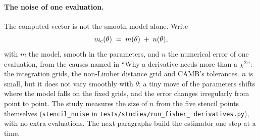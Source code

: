 \documentclass[11pt]{article}
\newcommand{\us}{\_\allowbreak}
\begin{document}
\paragraph{The noise of one evaluation.}
The computed vector is not the smooth model alone.  Write
\begin{equation}
  m_{\rm c}(\theta) \;=\; m(\theta) \;+\; n(\theta),
  \label{eq:noisedef}
\end{equation}
with $m$ the model, smooth in the parameters, and $n$ the numerical
error of one evaluation, from the causes named in ``Why a derivative
needs more than a $\chi^2$'': the integration grids, the non-Limber
distance grid and CAMB's tolerances.  $n$ is small, but it does not
vary smoothly with $\theta$: a tiny move of the parameters shifts
where the model falls on the fixed grids, and the error changes
irregularly from point to point.  The study measures the size of $n$
from the five stencil points themselves
(\texttt{stencil\us noise} in \texttt{tests/studies/run\us fisher\us
derivatives.py}), with no extra evaluations.  The next paragraphs
build the estimator one step at a time.
\end{document}
